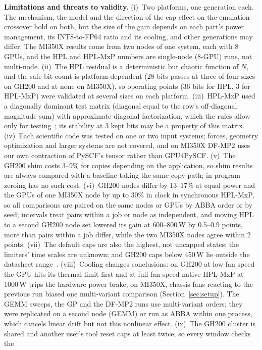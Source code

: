 \documentclass[conference]{IEEEtran}
\newcommand{\W}{\,W}
\newcommand{\pct}{\%}
\begin{document}
\textbf{Limitations and threats to validity.} (i)~Two platforms, one generation each. The mechanism, the model and the
direction of the cap effect on the emulation crossover hold on both, but the size of the gain depends on each part's
power management, its INT8-to-FP64 ratio and its cooling, and other generations may differ. The MI350X results come from
two nodes of one system, each with 8 GPUs, and the HPL and HPL-MxP numbers are single-node (8-GPU) runs, not multi-node.
(ii)~The HPL residual is a deterministic but chaotic function of $N$, and the safe bit count is platform-dependent
(28 bits passes at three of four sizes on GH200 and at none on MI350X), so operating points (36 bits for HPL, 3 for
HPL-MxP) were validated at several sizes on each platform. (iii)~HPL-MxP used a diagonally dominant test matrix
(diagonal equal to the row's off-diagonal magnitude sum) with approximate diagonal factorization, which the rules allow
only for testing~\cite{HPLMxPRules}; its stability at 3 kept bits may be a property of this matrix. (iv)~Each scientific
code was tested on one or two input systems; forces, geometry optimization and larger systems are not covered, and on
MI350X DF-MP2 uses our own contraction of PySCF's tensor rather than GPU4PySCF. (v)~The GH200 shim costs 3--9\pct{} for
copies depending on the application, so shim results are always compared with a baseline taking the same copy path;
in-program zeroing has no such cost. (vi)~GH200 nodes differ by 13--17\pct{} at equal power and the GPUs of one MI350X
node by up to 30\pct{} in clock in synchronous HPL-MxP, so all comparisons are paired on the same nodes or GPUs by ABBA
order or by seed; intervals treat pairs within a job or node as independent, and moving HPL to a second GH200 node set
lowered its gain at 600--800\W{} by 0.5--0.9 points, more than pairs within a job differ, while the two MI350X nodes
agree within 2 points. (vii)~The default caps are also the highest, not uncapped states; the limiters' time scales are
unknown; and GH200 caps below 450\W{} lie outside the datasheet range~\cite{NVIDIAGH200}. (viii)~Cooling changes
conclusions: on GH200 at low fan speed the GPU hits its thermal limit first and at full fan speed native HPL-MxP at
1000\W{} trips the hardware power brake; on MI350X, chassis fans reacting to the previous run biased one multi-variant
comparison (Section~\ref{sec:setup}). The GEMM sweeps, the GP and the DF-MP2 runs use multi-variant orders; they were
replicated on a second node (GEMM) or run as ABBA within one process, which cancels linear drift but not this nonlinear
effect. (ix)~The GH200 cluster is shared and another user's tool reset caps at least twice, so every window checks the
\end{document}
